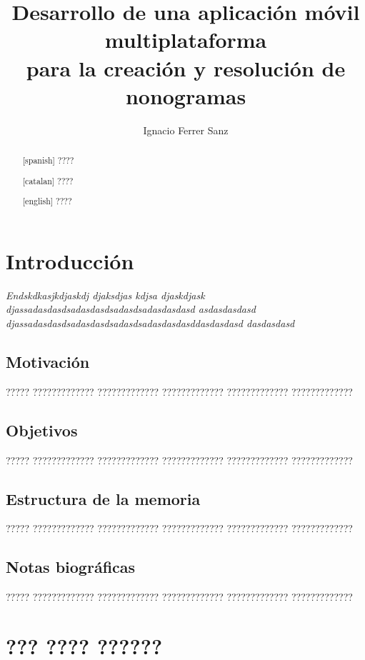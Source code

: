 \documentclass[11pt,spanish,listoffigures,listoftables]{tfgetsinf}
\title{Desarrollo de una aplicación móvil multiplataforma \\
para la creación y resolución de nonogramas}
\author{Ignacio Ferrer Sanz}
\begin{document}

\begin{abstract}[spanish]
????
\end{abstract}
\begin{abstract}[catalan]
   ????
   \end{abstract}
\begin{abstract}[english]
????
\end{abstract}

\mainmatter

\chapter{Introducción}

\textit{Endskdkasjkdjaskdj djaksdjas kdjsa djaskdjask djassadasdasdsadasdasdsadasdsadasdasdasd
asdasdasdasd
djassadasdasdsadasdasdsadasdsadasdasdasddasdasdasd
dasdasdasd}

\section{Motivación}

????? ????????????? ????????????? ????????????? ????????????? ????????????? 

\section{Objetivos}

????? ????????????? ????????????? ????????????? ????????????? ?????????????

\section{Estructura de la memoria}

????? ????????????? ????????????? ????????????? ????????????? ????????????? 

\section{Notas biográficas} %

????? ????????????? ????????????? ????????????? ????????????? ?????????????


\chapter{??? ???? ??????}
\end{document}
